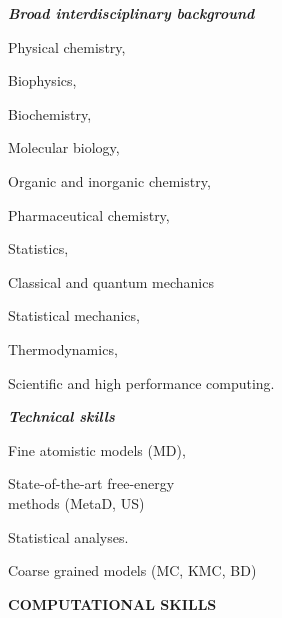 \documentclass[a4paper,10pt,final]{letter}
\newcommand{\Sep}{\vspace{1em}}
\newcommand{\SmallSep}{\vspace{0.4em}}
\newcommand{\CVSection}[1]
	{\Large\textbf{#1}\par
	\SmallSep\normalsize\normalfont}
\newcommand{\CVItem}[2]
	{\textit{\textbf{\color{RoyalBlue} #1}} #2}
\begin{document}
\CVItem{Broad interdisciplinary background} 
\begin{multicols}{3}
\begin{compactitem}[\color{RoyalBlue}$\circ$]
\item Physical chemistry,
\item Biophysics,
\item Biochemistry,
\item Molecular biology,
\item Organic and inorganic chemistry,
\item Pharmaceutical chemistry,
\item Statistics,
\item Classical and quantum mechanics
\item Statistical mechanics,
\item Thermodynamics,
\item Scientific and high performance computing. 
\end{compactitem}
\end{multicols}
\SmallSep
\CVItem{Technical skills}
\begin{multicols}{3}
\begin{compactitem}[\color{RoyalBlue}$\circ$]
\item Fine atomistic models (MD),
\item State-of-the-art free-energy\\ methods (MetaD, US)
\item Statistical analyses.
\item Coarse grained models (MC, KMC, BD)
\end{compactitem}
\end{multicols}
\Sep
\pagebreak
\CVSection{COMPUTATIONAL SKILLS}
\end{document}

